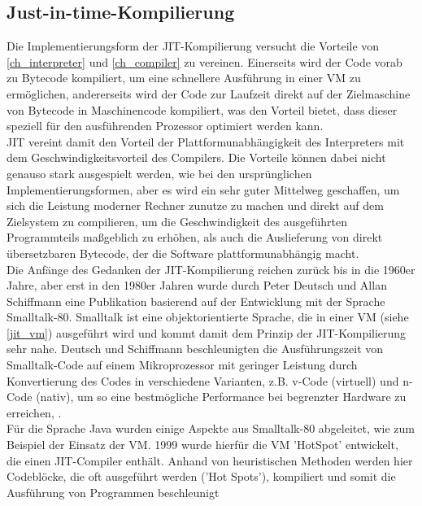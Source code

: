 \subsection{Just-in-time-Kompilierung} \label{ch_jit}
Die Implementierungsform der \ac{JIT}-Kompilierung versucht die Vorteile von \autoref{ch_interpreter} und \autoref{ch_compiler} zu vereinen. Einerseits wird der Code vorab zu Bytecode kompiliert, um eine schnellere Ausführung in einer \ac{VM} zu ermöglichen, andererseits wird der Code zur Laufzeit direkt auf der Zielmaschine von Bytecode in Maschinencode kompiliert, was den Vorteil bietet, dass dieser speziell für den ausführenden Prozessor optimiert werden kann.\\
\ac{JIT} vereint damit den Vorteil der Plattformunabhängigkeit des Interpreters mit dem Geschwindigkeitsvorteil des Compilers. Die Vorteile können dabei nicht genauso stark ausgespielt werden, wie bei den ursprünglichen Implementierungsformen, aber es wird ein sehr guter Mittelweg geschaffen, um sich die Leistung moderner Rechner zunutze zu machen und direkt auf dem Zielsystem zu compilieren, um die Geschwindigkeit des ausgeführten Programmteils maßgeblich zu erhöhen, als auch die Auslieferung von direkt übersetzbaren Bytecode, der die Software plattformunabhängig macht.\\
Die Anfänge des Gedanken der \ac{JIT}-Kompilierung reichen zurück bis in die 1960er Jahre, aber erst in den 1980er Jahren wurde durch Peter Deutsch und Allan Schiffmann eine Publikation basierend auf der Entwicklung mit der Sprache Smalltalk-80. Smalltalk ist eine objektorientierte Sprache, die in einer \ac{VM} (siehe \autoref{jit_vm}) ausgeführt wird und kommt damit dem Prinzip der \ac{JIT}-Kompilierung sehr nahe. Deutsch und Schiffmann beschleunigten die Ausführungszeit von Smalltalk-Code auf einem Mikroprozessor mit geringer Leistung durch Konvertierung des Codes in verschiedene Varianten, z.B. v-Code (virtuell) und n-Code (nativ), um so eine bestmögliche Performance bei begrenzter Hardware zu erreichen, \cite[vgl. Deutsch und Schiffmann 1984, S.1ff]{Deutsch_Schiffmann1984}.\\
Für die Sprache Java wurden einige Aspekte aus Smalltalk-80 abgeleitet, wie zum Beispiel der Einsatz der \ac{VM}. 1999 wurde hierfür die \ac{VM} 'HotSpot' entwickelt, die einen \ac{JIT}-Compiler enthält. Anhand von heuristischen Methoden werden hier Codeblöcke, die oft ausgeführt werden ('Hot Spots'), kompiliert und somit die Ausführung von Programmen beschleunigt \cite[vgl. Kotzmann und Wimmer 2008, S.2ff]{KotzmannWimmer2008}

